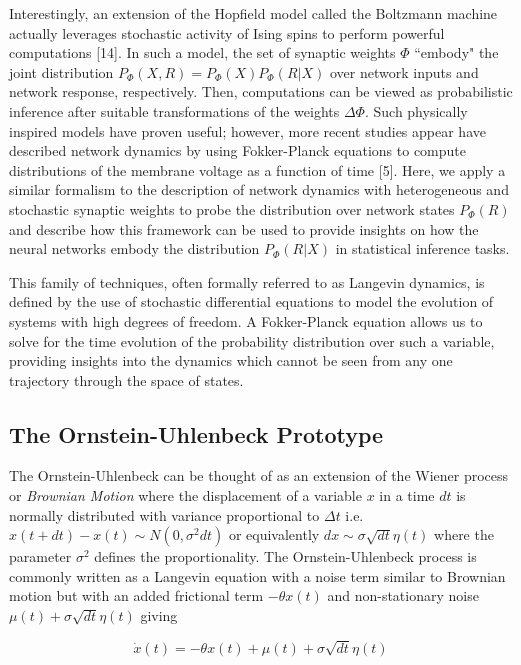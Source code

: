 \documentclass{ucetd}
\begin{document}
Interestingly, an extension of the Hopfield model called the Boltzmann machine actually leverages stochastic activity of Ising spins to perform powerful computations [14]. In such a model, the set of synaptic weights $\Phi$ ``embody" the joint distribution $P_{\Phi}(X,R) = P_{\Phi}(X)P_{\Phi}(R|X)$ over network inputs and network response, respectively. Then, computations can be viewed as probabilistic inference after suitable transformations of the weights $\Delta\Phi$. Such physically inspired models have proven useful; however, more recent studies appear have described network dynamics by using Fokker-Planck equations to compute distributions of the membrane voltage as a function of time [5]. Here, we apply a similar formalism to the description of network dynamics with heterogeneous and stochastic synaptic weights to probe the distribution over network states $P_{\Phi}(R)$ and describe how this framework can be used to provide insights on how the neural networks embody the distribution $P_{\Phi}(R|X)$ in statistical inference tasks. 

This family of techniques, often formally referred to as Langevin dynamics, is defined by the use of stochastic differential equations to model the evolution of systems with high degrees of freedom. A Fokker-Planck equation allows us to solve for the time evolution of the probability distribution over such a variable, providing insights into the dynamics which cannot be seen from any one trajectory through the space of states. 


\subsection{The Ornstein-Uhlenbeck Prototype}

The Ornstein-Uhlenbeck can be thought of as an extension of the Wiener process or \emph{Brownian Motion} where the displacement of a variable $x$ in a time $dt$ is normally distributed with variance proportional to $\Delta t$ i.e. $x(t+dt) - x(t) \sim N(0, \sigma^{2}dt)$ or equivalently $dx \sim \sigma\sqrt{dt}\eta(t)$ where the parameter $\sigma^{2}$ defines the proportionality. The Ornstein-Uhlenbeck process is commonly written as a Langevin equation with a noise term similar to Brownian motion but with an added frictional term $-\theta x(t)$ and non-stationary noise $\mu(t) + \sigma\sqrt{dt}\eta(t)$ giving

\begin{equation*}
\dot{x}(t) = -\theta x(t) + \mu(t) + \sigma\sqrt{dt}\eta(t)
\end{equation*}
\end{document}
